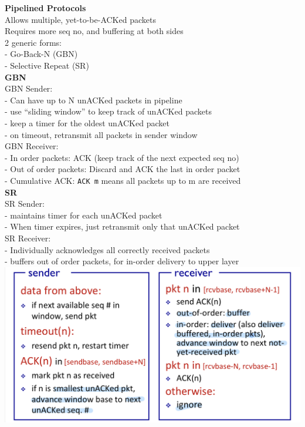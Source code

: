 \documentclass[10pt, a4paper]{article}
\newcommand{\blue}[1]{{\color{MidnightBlue}#1}}
\newcommand{\red}[1]{{\color{red}#1}}
\begin{document}
\begin{multicols*}{3}
		\textbf{Pipelined Protocols}\\
		Allows \blue{multiple, yet-to-be-ACKed} packets\\
		Requires more seq no, and buffering at both sides\\
		2 generic forms:\\
		- Go-Back-N (GBN)\\
		- Selective Repeat (SR)\\

		\textbf{GBN}\\
		GBN Sender:\\
		- Can have up to \blue{N unACKed packets} in pipeline\\
		- use ``sliding window'' to keep track of unACKed packets\\
		- keep a \blue{timer} for the \blue{oldest} unACKed packet\\
		- on timeout, retransmit all packets in sender window\\

		GBN Receiver:\\
		- \blue{In order packets}: ACK (keep track of the next expected seq no)\\
		- \blue{Out of order packets}: Discard and ACK the \blue{last in order packet}\\
		- \red{Cumulative ACK:} \texttt{ACK m} means all packets up to m are received\\

		\textbf{SR}\\
		SR Sender:\\
		- maintains timer for each unACKed packet\\
		- When timer expires, just retransmit \blue{only that unACKed packet}\\

		SR Receiver:\\
		- \red{Individually acknowledges} all correctly received packets\\
		- \blue{buffers out of order packets}, for in-order delivery to upper layer\\
		\includegraphics[scale=.14]{./assets/selectiveRepeat}


\end{multicols*}
\end{document}
